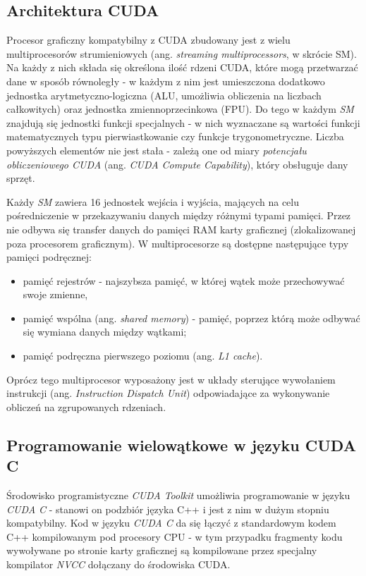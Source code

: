 \documentclass[12pt]{article}
\begin{document}
\subsection{Architektura CUDA}

Procesor graficzny kompatybilny z CUDA zbudowany jest z wielu multiprocesorów strumieniowych (ang. \textit{streaming multiprocessors}, w skrócie SM). Na każdy z nich składa się określona ilość rdzeni CUDA, które mogą przetwarzać dane w sposób równoległy - w każdym z nim jest umieszczona dodatkowo jednostka arytmetyczno-logiczna (ALU, umożliwia obliczenia na liczbach całkowitych) oraz jednostka zmiennoprzecinkowa (FPU). Do tego w każdym \textit{SM} znajdują się jednostki funkcji specjalnych - w nich wyznaczane są wartości funkcji matematycznych typu pierwiastkowanie czy funkcje trygonometryczne. Liczba powyższych elementów nie jest stała - zależą one od miary \textit{potencjału obliczeniowego CUDA} (ang. \textit{CUDA Compute Capability}), który obsługuje dany sprzęt.

Każdy \textit{SM} zawiera 16 jednostek wejścia i wyjścia, mających na celu pośredniczenie w przekazywaniu danych między różnymi typami pamięci. Przez nie odbywa się transfer danych do pamięci RAM karty graficznej (zlokalizowanej poza procesorem graficznym). W multiprocesorze są dostępne następujące typy pamięci podręcznej:

\begin{itemize}
\item pamięć rejestrów - najszybsza pamięć, w której wątek może przechowywać swoje zmienne,
\item pamięć wspólna (ang. \textit{shared memory}) - pamięć, poprzez którą może odbywać się wymiana danych między wątkami;
\item pamięć podręczna pierwszego poziomu (ang. \textit{L1 cache}).
\end{itemize}

Oprócz tego multiprocesor wyposażony jest w układy sterujące wywołaniem instrukcji (ang. \textit{Instruction Dispatch Unit}) odpowiadające za wykonywanie obliczeń na zgrupowanych rdzeniach.

\subsection{Programowanie wielowątkowe w języku CUDA C}

Środowisko programistyczne \textit{CUDA Toolkit} umożliwia programowanie w języku \textit{CUDA C} - stanowi on podzbiór języka C++ i jest z nim w dużym stopniu kompatybilny. Kod w języku \textit{CUDA C} da się łączyć z standardowym kodem C++ kompilowanym pod procesory CPU - w tym przypadku fragmenty kodu wywoływane po stronie karty graficznej są kompilowane przez specjalny kompilator \textit{NVCC} dołączany do środowiska CUDA.
\end{document}
